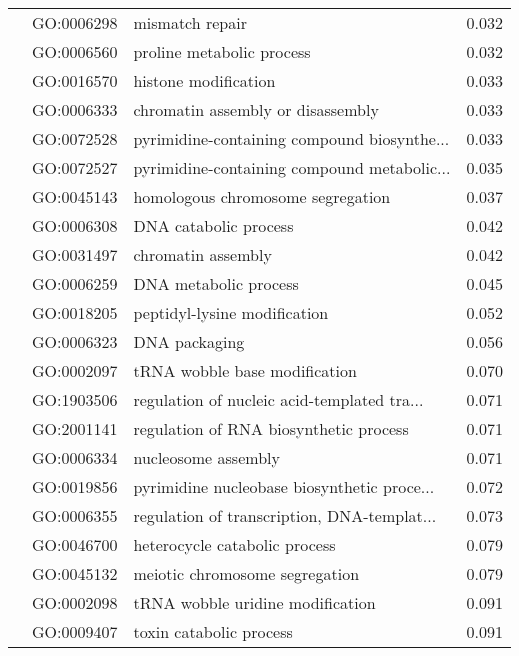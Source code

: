 \begin{longtable}{lllr}
   & GO:0006298 &                              mismatch repair &         0.032 \\
   & GO:0006560 &                    proline metabolic process &         0.032 \\
   & GO:0016570 &                         histone modification &         0.033 \\
   & GO:0006333 &            chromatin assembly or disassembly &         0.033 \\
   & GO:0072528 &  pyrimidine-containing compound biosynthe... &         0.033 \\
   & GO:0072527 &  pyrimidine-containing compound metabolic... &         0.035 \\
   & GO:0045143 &            homologous chromosome segregation &         0.037 \\
   & GO:0006308 &                        DNA catabolic process &         0.042 \\
   & GO:0031497 &                           chromatin assembly &         0.042 \\
   & GO:0006259 &                        DNA metabolic process &         0.045 \\
   & GO:0018205 &                 peptidyl-lysine modification &         0.052 \\
   & GO:0006323 &                                DNA packaging &         0.056 \\
   & GO:0002097 &                tRNA wobble base modification &         0.070 \\
   & GO:1903506 &  regulation of nucleic acid-templated tra... &         0.071 \\
   & GO:2001141 &       regulation of RNA biosynthetic process &         0.071 \\
   & GO:0006334 &                          nucleosome assembly &         0.071 \\
   & GO:0019856 &  pyrimidine nucleobase biosynthetic proce... &         0.072 \\
   & GO:0006355 &  regulation of transcription, DNA-templat... &         0.073 \\
   & GO:0046700 &                heterocycle catabolic process &         0.079 \\
   & GO:0045132 &               meiotic chromosome segregation &         0.079 \\
   & GO:0002098 &             tRNA wobble uridine modification &         0.091 \\
   & GO:0009407 &                      toxin catabolic process &         0.091 \\

\end{longtable}
